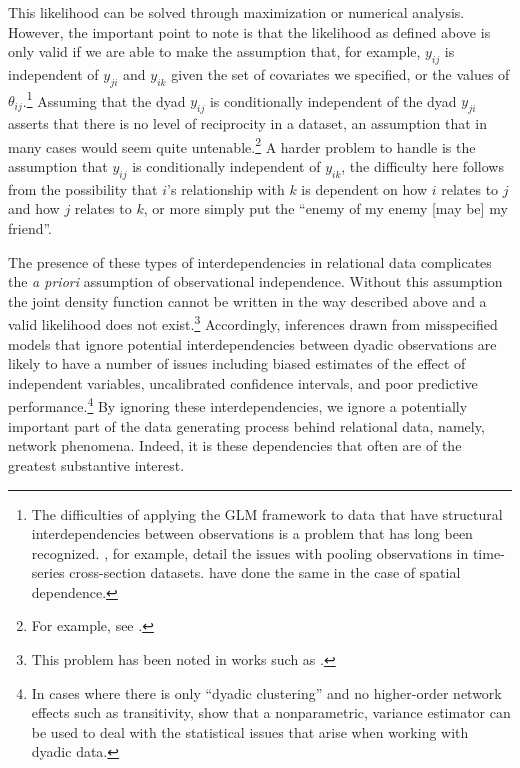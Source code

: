 This likelihood can be solved through maximization or numerical analysis. However, the important point to note is that the likelihood as defined above is only valid if we are able to make the assumption that, for example, $y_{ij}$ is independent of $y_{ji}$ and $y_{ik}$ given the set of covariates we specified, or the values of $\theta_{ij}$.\footnote{The difficulties of applying the GLM framework to data that have structural interdependencies between observations is a problem that has long been recognized. \citet{beck:katz:1995}, for example, detail the issues with pooling observations in time-series cross-section datasets. \citet{ward:gleditsch:2008} have done the same in the case of spatial dependence.} Assuming that the dyad $y_{ij}$ is conditionally independent of the dyad $y_{ji}$ asserts that there is no level of reciprocity in a dataset, an assumption that in many cases would seem quite untenable.\footnote{For example, see \citet{ward:etal:2007,cranmer:2014,dorff:minhas:2016}.} A harder problem to handle is the assumption that $y_{ij}$ is conditionally independent of $y_{ik}$, the difficulty here follows from the possibility that $i$'s relationship with $k$ is dependent on how $i$ relates to $j$ and how $j$ relates to $k$, or more simply put the ``enemy of my enemy [may be] my friend''. 

The presence of these types of interdependencies in relational data complicates the \textit{a priori} assumption of observational independence. Without this assumption the joint density function cannot be written in the way described above and  a valid likelihood does not exist.\footnote{This problem has been noted in works such as \citet{lai:1995,manger:etal:2012,kinne:2013}.} Accordingly, inferences drawn from misspecified models that ignore potential interdependencies between dyadic observations are likely to have a number of issues including biased estimates of the effect of independent variables, uncalibrated confidence intervals, and poor predictive performance.\footnote{In cases where there is only ``dyadic clustering'' and no higher-order network effects such as transitivity, \citet{aronow:etal:2015} show that a nonparametric, variance estimator can be used to deal with the statistical issues that arise when working with dyadic data.} By ignoring these interdependencies, we ignore a potentially important part of the data generating process behind relational data, namely, network phenomena. Indeed, it is these dependencies that often are of the greatest substantive interest. 

